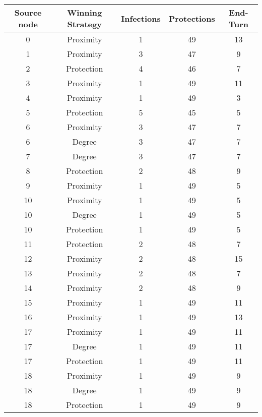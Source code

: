 \documentclass[results.tex]{subfiles}
\begin{document}
\begin{center}
  \begin{tabular}{| c || c | c | c | c |}
    \hline
    {\bfseries Source node} & {\bfseries Winning Strategy} & {\bfseries Infections} & {\bfseries Protections} & {\bfseries End-Turn} \\  %
    \hline\hline
    0 & Proximity & 1 & 49 & 13 \\ 
    \hline
    1 & Proximity & 3 & 47 & 9 \\ 
    \hline
    2 & Protection & 4 & 46 & 7 \\ 
    \hline
    3 & Proximity & 1 & 49 & 11 \\ 
    \hline
    4 & Proximity & 1 & 49 & 3 \\ 
    \hline
    5 & Protection & 5 & 45 & 5 \\ 
    \hline
    6 & Proximity & 3 & 47 & 7 \\ 
    \hline
    6 & Degree & 3 & 47 & 7 \\ 
    \hline
    7 & Degree & 3 & 47 & 7 \\ 
    \hline
    8 & Protection & 2 & 48 & 9 \\ 
    \hline
    9 & Proximity & 1 & 49 & 5 \\ 
    \hline
    10 & Proximity & 1 & 49 & 5 \\ 
    \hline
    10 & Degree & 1 & 49 & 5 \\ 
    \hline
    10 & Protection & 1 & 49 & 5 \\ 
    \hline
    11 & Protection & 2 & 48 & 7 \\ 
    \hline
    12 & Proximity & 2 & 48 & 15 \\ 
    \hline
    13 & Proximity & 2 & 48 & 7 \\ 
    \hline
    14 & Proximity & 2 & 48 & 9 \\ 
    \hline
    15 & Proximity & 1 & 49 & 11 \\ 
    \hline
    16 & Proximity & 1 & 49 & 13 \\ 
    \hline
    17 & Proximity & 1 & 49 & 11 \\ 
    \hline
    17 & Degree & 1 & 49 & 11 \\ 
    \hline
    17 & Protection & 1 & 49 & 11 \\ 
    \hline
    18 & Proximity & 1 & 49 & 9 \\ 
    \hline
    18 & Degree & 1 & 49 & 9 \\ 
    \hline
    18 & Protection & 1 & 49 & 9 \\ 
    \hline

\end{tabular}
\end{center}
\end{document}

